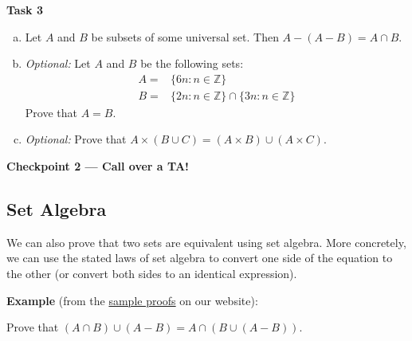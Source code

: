 \documentclass[12pt,letterpaper]{article}
\begin{document}
\newpage
\textbf{Task 3}

\begin{enumerate}[a.]    
    \item Let $A$ and $B$ be subsets of some universal set. Then $A - (A - B) = A \cap B$.
    \begin{mdframed} \vspace{4cm} \end{mdframed}
    
    \item \textit{Optional:} Let $A$ and $B$ be the following sets:
    \begin{equation*}
    \begin{aligned}
        A =& \{6n : n \in \mathbb{Z}\} \\
        B =& \{2n : n \in \mathbb{Z}\} \cap \{3n :  n \in \mathbb{Z}\}
    \end{aligned}
    \end{equation*}
    Prove that $A = B$.
    \begin{mdframed} \vspace{4cm} \end{mdframed}
    
    \item \textit{Optional:} Prove that $A \times (B \cup C) = (A \times B) \cup (A \times C)$.   
    \begin{mdframed} \vspace{4cm} \end{mdframed}
    
\end{enumerate}

\textbf{Checkpoint 2 — Call over a TA!}

\newpage
\subsection*{Set Algebra}
We can also prove that two sets are equivalent using set algebra. More concretely, we can use the stated laws of set algebra to convert one side of the equation to the other (or convert both sides to an identical expression).

\textbf{Example} (from the \href{https://cs22.netlify.app/#resources}{sample proofs} on our website):

Prove that $(A \cap B) \cup (A - B) = A \cap (B \cup (A - B))$.
\end{document}
